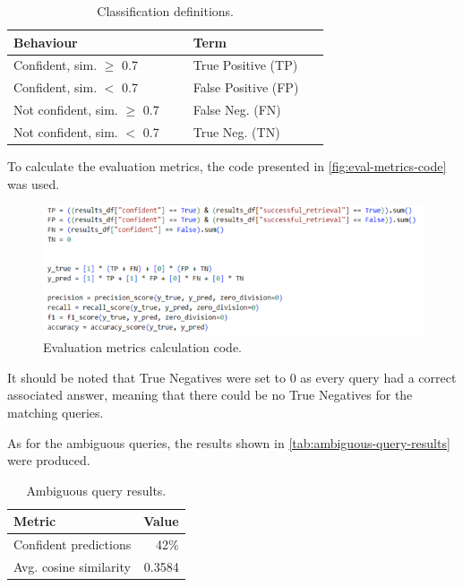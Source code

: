 \documentclass[11pt]{article}
\begin{document}
\begin{table}[t]
  \centering
  \begin{tabular}{p{0.50\linewidth}p{0.38\linewidth}}
    \textbf{Behaviour} & \textbf{Term} \\
    \hline
    Confident, sim. $\geq$ 0.7 & True Positive (TP) \\
    Confident, sim. $<$ 0.7 & False Positive (FP) \\
    Not confident, sim. $\geq$ 0.7 & False Neg. (FN) \\
    Not confident, sim. $<$ 0.7 & True Neg. (TN) \\
  \end{tabular}
  \caption{Classification definitions.}
  \label{tab:classification-definitions}
\end{table}

To calculate the evaluation metrics, the code presented in \autoref{fig:eval-metrics-code} was used.

\begin{figure}[t]
  \centering
  \includegraphics[width=\linewidth]{img/eval_metrics_code.png}
  \caption{Evaluation metrics calculation code.}
  \label{fig:eval-metrics-code}
\end{figure}

It should be noted that True Negatives were set to 0 as every query had a correct associated answer, meaning that there could be no True Negatives for the matching queries. 

As for the ambiguous queries, the results shown in \autoref{tab:ambiguous-query-results} were produced.

\begin{table}[t]
  \centering
  \begin{tabular}{l r}
    \textbf{Metric} & \textbf{Value} \\
    \hline
    Confident predictions & 42\% \\
    Avg. cosine similarity & 0.3584 \\
  \end{tabular}
  \caption{Ambiguous query results.}
  \label{tab:ambiguous-query-results}
\end{table}
\end{document}
